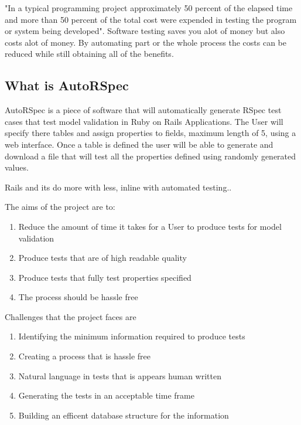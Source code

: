 \documentclass{article}
\begin{document}
\par "In a typical programming project approximately 50 percent of the elapsed time and more than 50 percent of the total cost were expended in testing the program or system being developed"\cite{myers2011art}. Software testing saves you alot of money but also costs alot of money. By automating part or the whole process the costs can be reduced while still obtaining all of the benefits.

\subsection{What is AutoRSpec}

\par AutoRSpec is a piece of software that will automatically generate RSpec test cases that test model validation in Ruby on Rails Applications. The User will specify there tables and assign properties to fields, maximum length of 5, using a web interface. Once a table is defined the user will be able to generate and download a file that will test all the properties defined using randomly generated values. 

\par Rails and its do more with less, inline with automated testing..

\par The aims of the project are to:
\begin{enumerate}
\item Reduce the amount of time it takes for a User to produce tests for model validation
\item Produce tests that are of high readable quality
\item Produce tests that fully test properties specified
\item The process should be hassle free
\end{enumerate}

\par Challenges that the project faces are
\begin{enumerate}
\item Identifying the minimum information required to produce tests
\item Creating a process that is hassle free
\item Natural language in tests that is appears human written
\item Generating the tests in an acceptable time frame
\item Building an efficent database structure for the information
\end{enumerate}
\end{document}
